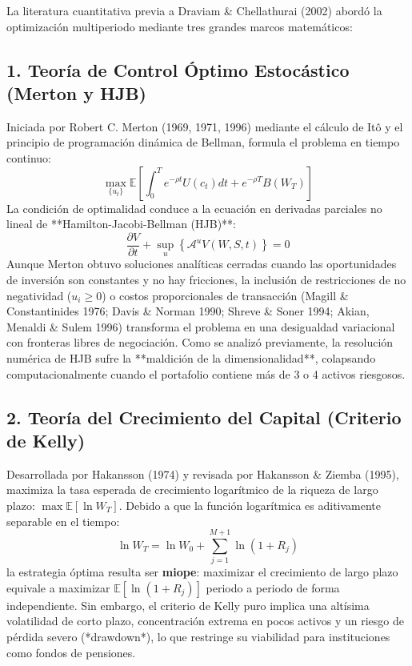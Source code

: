 \documentclass[11pt,a4paper]{report}
\numberwithin{equation}{chapter}
\begin{document}
La literatura cuantitativa previa a Draviam \& Chellathurai (2002) abordó la optimización multiperiodo mediante tres grandes marcos matemáticos:

\subsection{1. Teoría de Control Óptimo Estocástico (Merton y HJB)}
Iniciada por Robert C. Merton (1969, 1971, 1996) mediante el cálculo de Itô y el principio de programación dinámica de Bellman, formula el problema en tiempo continuo:
\begin{equation}
    \max_{\{u_t\}} \mathbb{E} \left[ \int_0^T e^{-\rho t} U(c_t) dt + e^{-\rho T} B(W_T) \right]
\end{equation}
La condición de optimalidad conduce a la ecuación en derivadas parciales no lineal de **Hamilton-Jacobi-Bellman (HJB)**:
\begin{equation}
    \frac{\partial V}{\partial t} + \sup_{u} \left\{ \mathcal{A}^u V(W, S, t) \right\} = 0
\end{equation}
Aunque Merton obtuvo soluciones analíticas cerradas cuando las oportunidades de inversión son constantes y no hay fricciones, la inclusión de restricciones de no negatividad ($u_i \ge 0$) o costos proporcionales de transacción (Magill \& Constantinides 1976; Davis \& Norman 1990; Shreve \& Soner 1994; Akian, Menaldi \& Sulem 1996) transforma el problema en una desigualdad variacional con fronteras libres de negociación. Como se analizó previamente, la resolución numérica de HJB sufre la **maldición de la dimensionalidad**, colapsando computacionalmente cuando el portafolio contiene más de 3 o 4 activos riesgosos.

\subsection{2. Teoría del Crecimiento del Capital (Criterio de Kelly)}
Desarrollada por Hakansson (1974) y revisada por Hakansson \& Ziemba (1995), maximiza la tasa esperada de crecimiento logarítmico de la riqueza de largo plazo: $\max \mathbb{E}[\ln W_T]$. Debido a que la función logarítmica es aditivamente separable en el tiempo:
\begin{equation}
    \ln W_T = \ln W_0 + \sum_{j=1}^{M+1} \ln(1 + R_j)
\end{equation}
la estrategia óptima resulta ser \textbf{miope}: maximizar el crecimiento de largo plazo equivale a maximizar $\mathbb{E}[\ln(1+R_j)]$ periodo a periodo de forma independiente. Sin embargo, el criterio de Kelly puro implica una altísima volatilidad de corto plazo, concentración extrema en pocos activos y un riesgo de pérdida severo (*drawdown*), lo que restringe su viabilidad para instituciones como fondos de pensiones.
\end{document}
